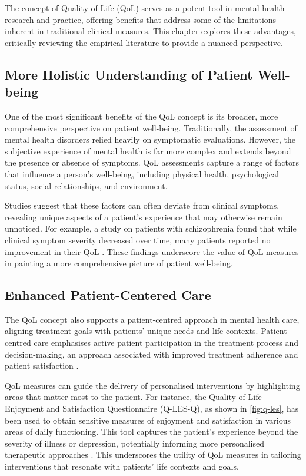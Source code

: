 \documentclass[10pt]{article}
\begin{document}
\begin{sloppypar}
  The concept of Quality of Life (QoL) serves as a potent tool in mental health research and practice, offering benefits that address some of the limitations inherent in traditional clinical measures. This chapter explores these advantages, critically reviewing the empirical literature to provide a nuanced perspective.

  \subsection{More Holistic Understanding of Patient Well-being}
  \label{subsec:holistic}
  One of the most significant benefits of the QoL concept is its broader, more comprehensive perspective on patient well-being. Traditionally, the assessment of mental health disorders relied heavily on symptomatic evaluations. However, the subjective experience of mental health is far more complex and extends beyond the presence or absence of symptoms. QoL assessments capture a range of factors that influence a person's well-being, including physical health, psychological status, social relationships, and environment.

  Studies suggest that these factors can often deviate from clinical symptoms, revealing unique aspects of a patient's experience that may otherwise remain unnoticed. For example, a study on patients with schizophrenia found that while clinical symptom severity decreased over time, many patients reported no improvement in their QoL \citep{eack_quality_2007}. These findings underscore the value of QoL measures in painting a more comprehensive picture of patient well-being.

  \subsection{Enhanced Patient-Centered Care}
  \label{subsec:patient-centered}
  The QoL concept also supports a patient-centred approach in mental health care, aligning treatment goals with patients' unique needs and life contexts. Patient-centred care emphasises active patient participation in the treatment process and decision-making, an approach associated with improved treatment adherence and patient satisfaction \citep{dwamena_interventions_2012}.

  QoL measures can guide the delivery of personalised interventions by highlighting areas that matter most to the patient. For instance, the Quality of Life Enjoyment and Satisfaction Questionnaire (Q-LES-Q), as shown in \autoref{fig:q-les}, has been used to obtain sensitive measures of enjoyment and satisfaction in various areas of daily functioning. This tool captures the patient's experience beyond the severity of illness or depression, potentially informing more personalised therapeutic approaches \citep{endicott_quality_1993}. This underscores the utility of QoL measures in tailoring interventions that resonate with patients' life contexts and goals.


\end{sloppypar}
\end{document}
